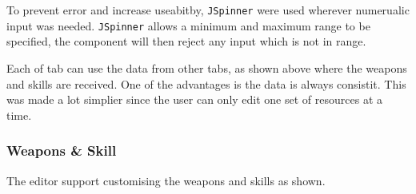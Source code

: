 To prevent error and increase useabitby,  \texttt{JSpinner} were used wherever numerualic input was needed. \texttt{JSpinner} allows a minimum and maximum range to be specified,  the component will then reject any input which is not in range.

Each of tab can use the data from other tabs, as shown above where the weapons and skills are received. One of the advantages is the data is always consistit. This was made a lot simplier since the user can only edit one set of resources at a time.

\clearpage
\subsubsection{Weapons \& Skill}

The editor support customising the weapons and skills as shown. 

